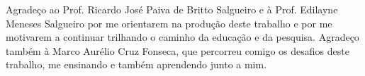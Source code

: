 \begin{agradecimentos}

 Agradeço ao Prof. Ricardo José Paiva de Britto Salgueiro e à Prof. Edilayne Meneses Salgueiro por me orientarem na produção deste trabalho e por me motivarem a continuar trilhando o caminho da educação e da pesquisa. Agradeço também à Marco Aurélio Cruz Fonseca, que percorreu comigo os desafios deste trabalho, me ensinando e também aprendendo junto a mim.
\end{agradecimentos}
